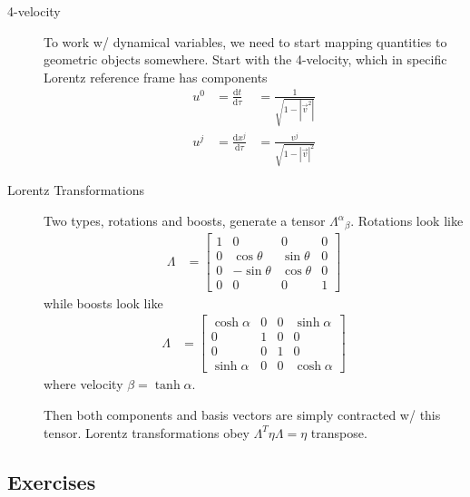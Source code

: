 \documentclass[12pt]{report}
\newcommand{\rd}[2]{\frac{\mathrm{d}#1}{\mathrm{d}#2}}
\newcommand{\abs}[1]{\left|#1\right|}
\begin{document}
\begin{description}
    \item[4-velocity] To work w/ dynamical variables, we need to start mapping
        quantities to geometric objects somewhere. Start with the 4-velocity,
        which in specific Lorentz reference frame has components
        \begin{align}
            u^0 &= \rd{t}{\tau} &= \frac{1}{\sqrt{1 - \abs{\vec{v}^2}}} \nonumber\\
            u^j &= \rd{x^j}{\tau} &= \frac{v^j}{\sqrt{1 - \abs{\vec{v}}^2}}
        \end{align}

    \item[Lorentz Transformations] Two types, rotations and boosts, generate a
        tensor ${\Lambda^\alpha}_\beta$. Rotations look like
        \begin{align}
            \Lambda &= \begin{bmatrix}
            1 & 0 & 0 & 0\\
            0 & \cos\theta & \sin\theta & 0\\
            0 & -\sin\theta & \cos\theta & 0\\
            0 & 0 & 0 & 1
            \end{bmatrix}
        \end{align}
        while boosts look like
        \begin{align}
            \Lambda &= \begin{bmatrix}
                \cosh \alpha & 0 & 0 & \sinh\alpha\\
                0 & 1 & 0 & 0\\
                0 & 0 & 1 & 0\\
                \sinh\alpha & 0 & 0 & \cosh\alpha
            \end{bmatrix}
        \end{align}
        where velocity $\beta = \tanh \alpha$.

        Then both components and basis vectors are simply contracted w/ this
        tensor. Lorentz transformations obey $\Lambda^T \eta \Lambda = \eta$
        transpose.
\end{description}

\subsection{Exercises}
\end{document}
